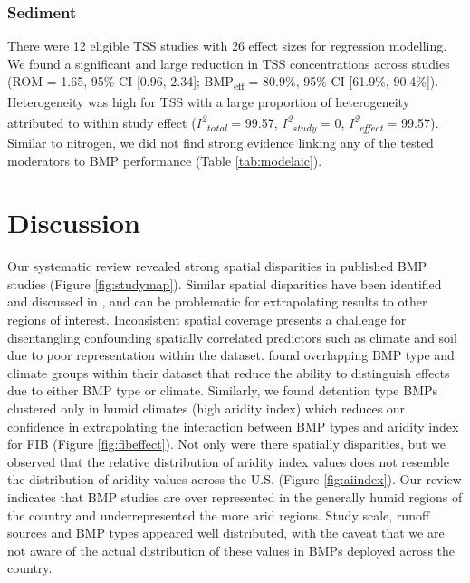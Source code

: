 \documentclass[utf8]{FrontiersinHarvard}
\begin{document}
\hypertarget{sediment}{%
\subsubsection{Sediment}\label{sediment}}

There were 12 eligible TSS studies with 26 effect sizes for regression modelling.
We found a significant and large reduction in TSS concentrations across studies (ROM = 1.65, 95\% CI {[}0.96, 2.34{]}; BMP\textsubscript{eff} = 80.9\%, 95\% CI {[}61.9\%, 90.4\%{]}).
Heterogeneity was high for TSS with a large proportion of heterogeneity attributed to within study effect (\textit{I\textsuperscript{2}\textsubscript{total}} = 99.57, \textit{I\textsuperscript{2}\textsubscript{study}} = 0, \textit{I\textsuperscript{2}\textsubscript{effect}} = 99.57).
Similar to nitrogen, we did not find strong evidence linking any of the tested moderators to BMP performance (Table \ref{tab:modelaic}).

\hypertarget{discussion}{%
\section{Discussion}\label{discussion}}

Our systematic review revealed strong spatial disparities in published BMP studies (Figure \ref{fig:studymap}).
Similar spatial disparities have been identified and discussed in \citet{kochNitrogenRemovalStormwater2014}, \citet{grudzinskiDoesRiparianFencing2020} and can be problematic for extrapolating results to other regions of interest.
Inconsistent spatial coverage presents a challenge for disentangling confounding spatially correlated predictors such as climate and soil due to poor representation within the dataset.
\citet{horvathEffectsRegionalClimate2023} found overlapping BMP type and climate groups within their dataset that reduce the ability to distinguish effects due to either BMP type or climate.
Similarly, we found detention type BMPs clustered only in humid climates (high aridity index) which reduces our confidence in extrapolating the interaction between BMP types and aridity index for FIB (Figure \ref{fig:fibeffect}).
Not only were there spatially disparities, but we observed that the relative distribution of aridity index values does not resemble the distribution of aridity values across the U.S. (Figure \ref{fig:aiindex}).
Our review indicates that BMP studies are over represented in the generally humid regions of the country and underrepresented the more arid regions.
Study scale, runoff sources and BMP types appeared well distributed, with the caveat that we are not aware of the actual distribution of these values in BMPs deployed across the country.
\end{document}
